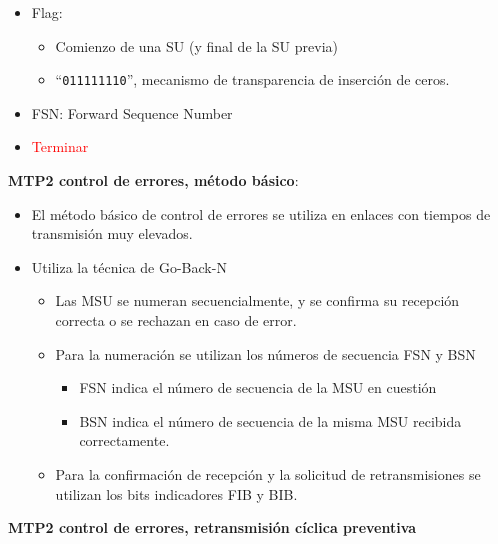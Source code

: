 \documentclass[10pt,portrait, twocolumn]{article}
\begin{document}
	\begin{itemize}
	\item Flag:
		\begin{itemize}
		\item Comienzo de una SU (y final de la SU previa)
		\item ``\texttt{011111110}'', mecanismo de transparencia de inserción de ceros.
		\end{itemize}
	\item FSN: Forward Sequence Number
	\item \textcolor{red}{Terminar}
	\end{itemize}
	
\textbf{MTP2 control de errores, método básico}:

	\begin{itemize}
	\item El método básico de control de errores se utiliza en enlaces con tiempos de transmisión muy elevados.
	\item Utiliza la técnica de Go-Back-N
		\begin{itemize}
		\item Las MSU se numeran secuencialmente, y se confirma su recepción correcta o se rechazan en caso de error.
		\item Para la numeración se utilizan los números de secuencia FSN y BSN
			\begin{itemize}
			\item FSN indica el número de secuencia de la MSU en cuestión
			\item BSN indica el número de secuencia de la misma MSU recibida correctamente.
			\end{itemize}
		\item Para la confirmación de recepción y la solicitud de retransmisiones se utilizan los bits indicadores FIB y BIB.
		\end{itemize}
	\end{itemize}

\textbf{MTP2 control de errores, retransmisión cíclica preventiva}
\end{document}
